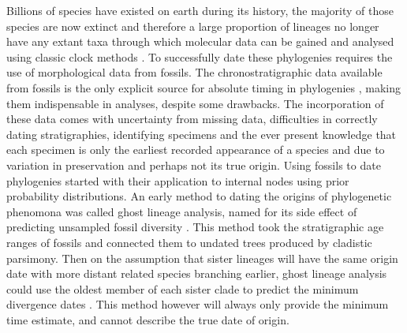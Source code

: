 \documentclass[11pt,letterpaper]{article}
\begin{document}
Billions of species have existed on earth during its history, the majority of those species are now extinct and therefore a large proportion of lineages no longer have any extant taxa through which molecular data can be gained and analysed using classic clock methods \citep{turner2017empirical}. %
To successfully date these phylogenies requires the use of morphological data from fossils.
The chronostratigraphic %
data available from fossils is the only explicit source for absolute timing in phylogenies \citep{turner2017empirical}, making them indispensable in analyses, despite some drawbacks.
The incorporation of these data comes with uncertainty from missing data, difficulties in correctly dating stratigraphies, identifying specimens and the ever present knowledge that each specimen is only the earliest recorded appearance of a species and due to variation in preservation and perhaps not its true origin. %
Using fossils to date phylogenies started with their application to internal nodes using prior probability distributions. %
An early method to dating the origins of phylogenetic phenomona was called ghost lineage analysis, named for its side effect of predicting unsampled fossil diversity \citep{norell1992taxic}. %
This method took the stratigraphic age ranges of fossils and connected them to undated trees produced by cladistic parsimony. %
Then on the assumption that sister lineages will have the same origin date with more distant related species branching earlier, ghost lineage analysis could use the oldest member of each sister clade to predict the minimum divergence dates \citep{norell1992taxic}. %
This method however will always only provide the minimum time estimate, and cannot describe the true date of origin. %
\end{document}
